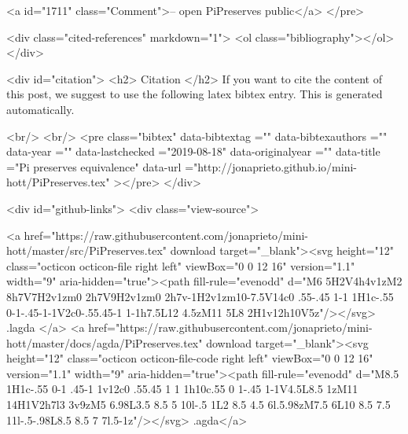 <a id="1711" class="Comment">-- open PiPreserves public</a>
</pre>


  <div class="cited-references" markdown="1">
  <ol class="bibliography"></ol>
  </div>


  
  <div id="citation">
  <h2> Citation </h2>
  If you want to cite the content of this post,
  we suggest to use the following latex bibtex entry.
  This is generated automatically.

  <br/>
  <br/>
  <pre class="bibtex"
       data-bibtextag =""
       data-bibtexauthors =""
       data-year =""
       data-lastchecked ="2019-08-18"
       data-originalyear =""
       data-title ="Pi preserves equivalence"
       data-url ="http://jonaprieto.github.io/mini-hott/PiPreserves.tex"
  ></pre>
  </div>
  

  <div id="github-links">
    <div class="view-source">
      
        <a href="https://raw.githubusercontent.com/jonaprieto/mini-hott/master/src/PiPreserves.tex" download target="_blank"><svg height="12" class="octicon octicon-file right left" viewBox="0 0 12 16" version="1.1" width="9" aria-hidden="true"><path fill-rule="evenodd" d="M6 5H2V4h4v1zM2 8h7V7H2v1zm0 2h7V9H2v1zm0 2h7v-1H2v1zm10-7.5V14c0 .55-.45 1-1 1H1c-.55 0-1-.45-1-1V2c0-.55.45-1 1-1h7.5L12 4.5zM11 5L8 2H1v12h10V5z"/></svg> .lagda </a>
        <a href="https://raw.githubusercontent.com/jonaprieto/mini-hott/master/docs/agda/PiPreserves.tex" download target="_blank"><svg height="12" class="octicon octicon-file-code right left" viewBox="0 0 12 16" version="1.1" width="9" aria-hidden="true"><path fill-rule="evenodd" d="M8.5 1H1c-.55 0-1 .45-1 1v12c0 .55.45 1 1 1h10c.55 0 1-.45 1-1V4.5L8.5 1zM11 14H1V2h7l3 3v9zM5 6.98L3.5 8.5 5 10l-.5 1L2 8.5 4.5 6l.5.98zM7.5 6L10 8.5 7.5 11l-.5-.98L8.5 8.5 7 7l.5-1z"/></svg> .agda</a>
      
